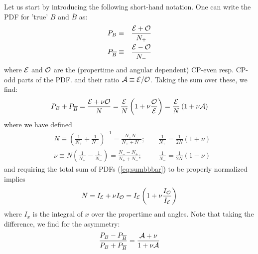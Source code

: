 \documentclass[a4paper,10pt,twosided]{article}
\begin{document}
Let us start by introducing the following short-hand notation. One can write the 
PDF for 'true' $B$ and $\overline{B}$ as:
\begin{eqnarray}
   P_{B}           &\equiv&\frac{ {\cal E} + {\cal O}}{N_+} \\
   P_{\overline{B}} &\equiv&\frac{ {\cal E} - {\cal O}}{N_-}
\end{eqnarray}
where ${\cal E}$ and ${\cal O}$ are the (propertime and angular dependent) CP-even resp. CP-odd parts of the PDF.
and their ratio ${\cal A} \equiv {\cal E / O }$.
Taking the sum over these, we find:
\begin{equation}
   P_{B} + P_{\overline{B}} =  \frac{ {\cal E} + \nu{\cal O} }{N}  = \frac{\cal E} {N} \left( 1 + \nu \frac{ \cal O }{\cal E} \right) = \frac{\cal E}{N} \left(1 + \nu {\cal A}\right)
   \label{eq:sumbbbar}
\end{equation}
where we have defined
\begin{eqnarray}
   &  N \equiv \left( \frac{1}{N_+}+\frac{1}{N_-}\right)^{-1} = \frac{N_+N_-}{N_+ + N_-};\;\;\;\; &  \frac{1}{N_+} =\frac{1}{2N}(1+\nu) \\
   &\nu \equiv N \left( \frac{1}{N_+}-\frac{1}{N_-}\right) = \frac{N_- - N_+}{N_+ +N_-}; & \frac{1}{N_-} =\frac{1}{2N}(1-\nu) 
\end{eqnarray}
and requiring the total sum of PDFs (\ref{eq:sumbbbar}) to be properly normalized implies
\begin{equation}
   N = I_{\cal E} + \nu I_{\cal O} 
     = I_{\cal E} \left( 1 + \nu \frac{ I_{\cal O}}{I_{\cal E}}   \right)
\end{equation}
where $I_x$ is the integral of $x$ over the propertime and angles.
Note that taking the difference, we find for the asymmetry:
\begin{equation}
  \frac{P_{B} - P_{\overline{B}}}{P_{B} + P_{\overline{B}}} =  \frac{ {\cal A} + \nu}{1+\nu{\cal A}}
   \label{eq:difbbbar}
\end{equation}
\end{document}
